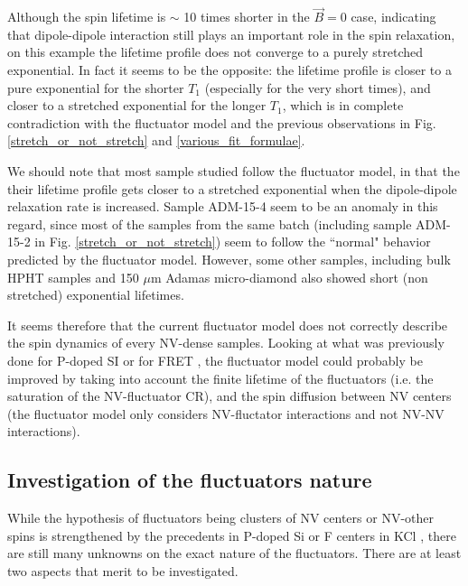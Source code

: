 \documentclass[a4paper, 11pt]{report}
\begin{document}
Although the spin lifetime is $\sim$ 10 times shorter in the $\vec{B}=0$ case, indicating that dipole-dipole interaction still plays an important role in the spin relaxation, on this example the lifetime profile does not converge to a purely stretched exponential. In fact it seems to be the opposite: the lifetime profile is closer to a pure exponential for the shorter $T_1$ (especially for the very short times), and closer to a stretched exponential for the longer $T_1$, which is in complete contradiction with the fluctuator model and the previous observations in Fig. \ref{stretch_or_not_stretch} and \ref{various_fit_formulae}.

We should note that most sample studied follow the fluctuator model, in that the their lifetime profile gets closer to a stretched exponential when the dipole-dipole relaxation rate is increased. Sample ADM-15-4 seem to be an anomaly in this regard, since most of the samples from the same batch (including sample ADM-15-2 in Fig. \ref{stretch_or_not_stretch}) seem to follow the ``normal" behavior predicted by the fluctuator model. However, some other samples, including bulk HPHT samples and 150 $\mu$m Adamas micro-diamond also showed short (non stretched) exponential lifetimes.

It seems therefore that the current fluctuator model does not correctly describe the spin dynamics of every NV-dense samples. Looking at what was previously done for P-doped SI \citep{vugmeister1978spin} or for FRET \citep{yokota1967effects}, the fluctuator model could probably be improved by taking into account the finite lifetime of the fluctuators (i.e. the saturation of the NV-fluctuator CR), and the spin diffusion between NV centers (the fluctuator model only considers NV-fluctator interactions and not NV-NV interactions).

\subsection{Investigation of the fluctuators nature}
While the hypothesis of fluctuators being clusters of NV centers or NV-other spins is strengthened by the precedents in P-doped Si \citep{honig1960electron} or F centers in KCl \citep{warren1964spin}, there are still many unknowns on the exact nature of the fluctuators. There are at least two aspects that merit to be investigated.
\end{document}
